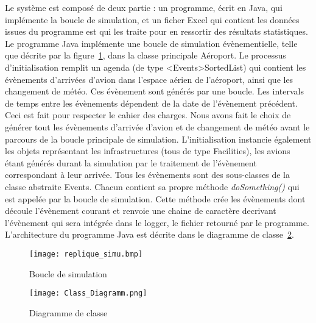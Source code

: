 

Le système est composé de deux partie : un programme, écrit en Java,  qui implémente la boucle de simulation, et un ficher Excel qui contient les données issues du programme est qui les traite pour en ressortir des résultats statistiques.
\\
Le programme Java implémente une boucle de simulation évènementielle, telle que décrite par la figure~\ref{replique}, dans la classe principale Aéroport. 
Le processus d'initialisation remplit un agenda (de type <Events>SortedList) qui contient les évènements d'arrivées d'avion dans l'espace aérien de l'aéroport, ainsi que les changement de météo. Ces évènement sont générés par une boucle. Les intervals de temps entre les évènements dépendent de la date de l'évènement précédent. Ceci est fait pour respecter le cahier des charges. Nous avons fait le choix de générer tout les évènements d'arrivée d'avion et de changement de météo avant le parcours de la boucle principale de simulation. L'initialisation instancie également les objets représentant les infrastructures (tous de type Facilities), les avions étant générés durant la simulation par le traitement de l'évènement correspondant à leur arrivée.
Tous les évènements sont des sous-classes de la classe abstraite Events. Chacun contient sa propre méthode \textit{doSomething()} qui est appelée par la boucle de simulation. Cette méthode crée les évènements dont découle l'évènement courant et renvoie une chaine de caractère decrivant l'évènement qui sera intégrée dans le logger, le fichier retourné par le programme.
L'architecture du programme Java est décrite dans le diagramme de classe~\ref{class_diagramm}.

 \begin{figure}[h]
   \caption{\label{replique} Boucle de simulation}
 \texttt{[image: replique\_simu.bmp]}
 \end{figure}

\begin{figure}[h]
   \caption{\label{class_diagramm} Diagramme de classe}
 \texttt{[image: Class\_Diagramm.png]}
 \end{figure}
 
